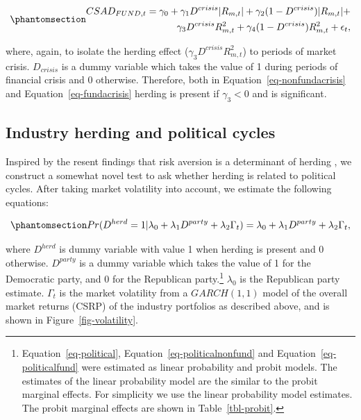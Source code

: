\documentclass[
  letterpaper,
  DIV=11,
  numbers=noendperiod]{scrartcl}
\begin{document}
\begin{equation}\phantomsection\label{eq-fundacrisis}{
\begin{aligned}
CSAD_{FUND, t} = \gamma_0 +  \gamma_1D^{crisis}|R_{m, t}| + \gamma_2(1 - D^{crisis})|R_{m,t}|  + \\ \gamma_3D^{crisis}R_{m, t}^2 + \gamma_4(1-D^{crisis})R_{m,t}^2 + \epsilon_{t},
\end{aligned}
}\end{equation}

where, again, to isolate the herding effect
(\(\gamma_3D^{crisis}R_{m, t}^2\)) to periods of market crisis.
\(D_{crisis}\) is a dummy variable which takes the value of 1 during
periods of financial crisis and 0 otherwise. Therefore, both in
Equation~\ref{eq-nonfundacrisis} and Equation~\ref{eq-fundacrisis}
herding is present if \(\gamma_3 < 0\) and is significant.

\subsection{Industry herding and political
cycles}\label{industry-herding-and-political-cycles}

Inspired by the resent findings that risk aversion is a determinant of
herding \citep{nath2020investor}, we construct a somewhat novel test to
ask whether herding is related to political cycles. After taking market
volatility into account, we estimate the following equations:

\begin{equation}\phantomsection\label{eq-political}{Pr(D^{herd} = 1 |\lambda_0 +  \lambda_1D^{party}  + \lambda_2\Gamma_t) = \lambda_0 +  \lambda_1D^{party}  + \lambda_2\Gamma_t,}\end{equation}

where \(D^{herd}\) is dummy variable with value 1 when herding is
present and 0 otherwise. \(D^{party}\) is a dummy variable which takes
the value of 1 for the Democratic party, and 0 for the Republican
party.\footnote{Equation~\ref{eq-political},
  Equation~\ref{eq-politicalnonfund} and Equation~\ref{eq-politicalfund}
  were estimated as linear probability and probit models. The estimates
  of the linear probability model are the similar to the probit marginal
  effects. For simplicity we use the linear probability model estimates.
  The probit marginal effects are shown in Table~\ref{tbl-probit}.}
\(\lambda_0\) is the Republican party estimate. \(\Gamma_t\) is the
market volatility from a \(GARCH(1,1)\) model of the overall market
returns (CSRP) of the industry portfolios as described above, and is
shown in Figure~\ref{fig-volatility}.
\end{document}

